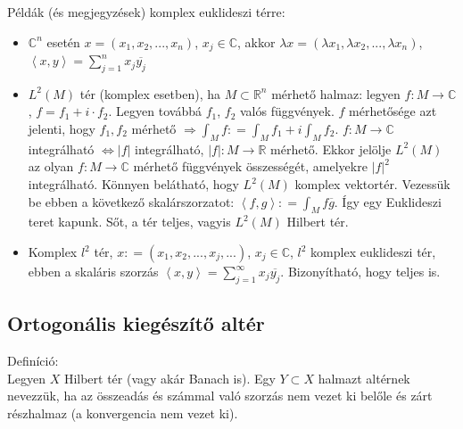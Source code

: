 \documentclass[12pt,a4paper]{scrartcl}
\providecommand{\tightlist}{%
  \setlength{\itemsep}{0pt}\setlength{\parskip}{0pt}}
\newenvironment{definicio}{}{}
\newenvironment{megjegyzes}{}{}
\begin{document}
\begin{megjegyzes}

Példák (és megjegyzések) komplex euklideszi térre:

\begin{itemize}
\tightlist
\item
  \({\mathbb{C}}^{n}\) esetén
  \(x = \left( {x_{1},x_{2},...,x_{n}} \right)\),
  \(x_{j} \in {\mathbb{C}}\), akkor
  \(\lambda x = \left( {\lambda x_{1},\lambda x_{2},...,\lambda x_{n}} \right)\),
  \(\left\langle {x,y} \right\rangle = {\sum\limits_{j = 1}^{n}{x_{j}\overline{y_{j}}}}\)
\item
  \(L^{2}\left( M \right)\) tér (komplex esetben), ha
  \(M \subset {\mathbb{R}}^{n}\) mérhető halmaz: legyen
  \(\left. f:M\rightarrow{\mathbb{C}} \right.\),
  \(f = f_{1} + i \cdot f_{2}\). Legyen továbbá \(f_{1}\), \(f_{2}\)
  valós függvények. \(f\) mérhetősége azt jelenti, hogy \(f_{1},f_{2}\)
  mérhető
  \(\left. \Rightarrow{\int_{M}f}: = {\int_{M}f_{1}} + i{\int_{M}f_{2}} \right.\).
  \(\left. f:M\rightarrow{\mathbb{C}} \right.\) integrálható
  \(\left. \Leftrightarrow\left| f \right| \right.\) integrálható,
  \(\left. \left| f \right|:M\rightarrow{\mathbb{R}} \right.\) mérhető.
  Ekkor jelölje \(L^{2}\left( M \right)\) az olyan
  \(\left. f:M\rightarrow{\mathbb{C}} \right.\) mérhető függvények
  összességét, amelyekre \(\left| f \right|^{2}\) integrálható. Könnyen
  belátható, hogy \(L^{2}\left( M \right)\) komplex vektortér. Vezessük
  be ebben a következő skalárszorzatot:
  \(\left\langle {f,g} \right\rangle: = {\int_{M}{f\overline{g}}}\). Így
  egy Euklideszi teret kapunk. Sőt, a tér teljes, vagyis
  \(L^{2}\left( M \right)\) Hilbert tér.
\item
  Komplex \(l^{2}\) tér,
  \(x: = \left( {x_{1},x_{2},...,x_{j},...} \right)\),
  \(x_{j} \in {\mathbb{C}}\), \(l^{2}\) komplex euklideszi tér, ebben a
  skaláris szorzás
  \(\left\langle {x,y} \right\rangle = {\sum\limits_{j = 1}^{\infty}{x_{j}\overline{y_{j}}}}\).
  Bizonyítható, hogy teljes is.
\end{itemize}

\end{megjegyzes}

\hypertarget{ortogonalis-kiegeszito-alter}{%
\subsection{Ortogonális kiegészítő
altér}\label{ortogonalis-kiegeszito-alter}}

\begin{definicio}

Definíció:\\
Legyen \(X\) Hilbert tér (vagy akár Banach is). Egy \(Y \subset X\)
halmazt altérnek nevezzük, ha az összeadás és számmal való szorzás nem
vezet ki belőle és zárt részhalmaz (a konvergencia nem vezet ki).

\end{definicio}
\end{document}

